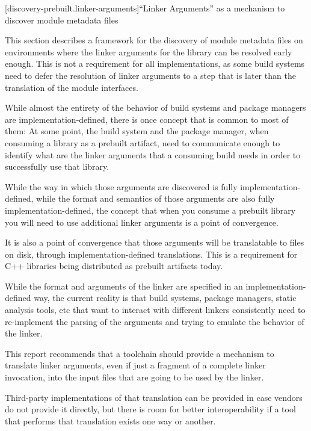 
[discovery-prebuilt.linker-arguments]{``Linker Arguments'' as a
  mechanism to discover \Cpp{} module metadata files}

\pnum This section describes a framework for the discovery of module
metadata files on environments where the linker arguments for the
library can be resolved early enough. This is not a requirement for
all implementations, as some build systems need to defer the
resolution of linker arguments to a step that is later than the
translation of the module interfaces.

\pnum While almost the entirety of the behavior of build systems and
package managers are implementation-defined, there is once concept
that is common to most of them: At some point, the build system and
the package manager, when consuming a library as a prebuilt artifact,
need to communicate enough to identify what are the linker arguments
that a consuming build needs in order to successfully use that
library.

\pnum While the way in which those arguments are discovered is fully
implementation-defined, while the format and semantics of those
arguments are also fully implementation-defined, the concept that when
you consume a prebuilt library you will need to use additional linker
arguments is a point of convergence.

\pnum It is also a point of convergence that those arguments will be
translatable to files on disk, through implementation-defined
translations. This is a requirement for C++ libraries being
distributed as prebuilt artifacts today.

\pnum While the format and arguments of the linker are specified in an
implementation-defined way, the current reality is that build systems,
package managers, static analysis tools, etc that want to interact
with different linkers consistently need to re-implement the parsing
of the arguments and trying to emulate the behavior of the linker.

\pnum This report recommends that a toolchain should provide a
mechanism to translate linker arguments, even if just a fragment of a
complete linker invocation, into the input files that are going to be
used by the linker.

\pnum Third-party implementations of that translation can be provided
in case vendors do not provide it directly, but there is room for
better interoperability if a tool that performs that translation
exists one way or another.

